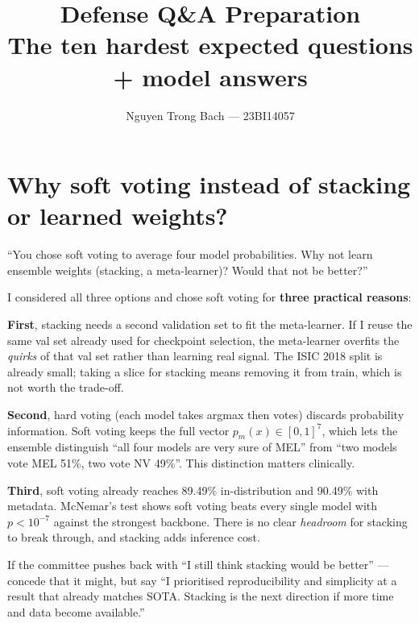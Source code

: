 \documentclass[11pt,a4paper]{article}
\title{
  \vspace{-1.5cm}
  \color{usthblue}\Large\textbf{Defense Q\&A Preparation}\\[4pt]
  \color{black!75}\normalsize The ten hardest expected questions + model answers
}
\author{Nguyen Trong Bach --- 23BI14057}
\date{}
\begin{document}
\maketitle
\vspace{-0.8cm}

{\hypersetup{linkcolor=black}\tableofcontents}
\newpage

\section{Why soft voting instead of stacking or learned weights?}

\begin{question}
``You chose soft voting to average four model probabilities. Why not learn ensemble weights (stacking, a meta-learner)? Would that not be better?''
\end{question}

\begin{answer}
I considered all three options and chose soft voting for \textbf{three practical reasons}:

\textbf{First}, stacking needs a second validation set to fit the meta-learner. If I reuse the same val set already used for checkpoint selection, the meta-learner overfits the \textit{quirks} of that val set rather than learning real signal. The ISIC 2018 split is already small; taking a slice for stacking means removing it from train, which is not worth the trade-off.

\textbf{Second}, hard voting (each model takes argmax then votes) discards probability information. Soft voting keeps the full vector $p_m(x) \in [0,1]^7$, which lets the ensemble distinguish ``all four models are very sure of MEL'' from ``two models vote MEL 51\%, two vote NV 49\%''. This distinction matters clinically.

\textbf{Third}, soft voting already reaches 89.49\% in-distribution and 90.49\% with metadata. McNemar's test shows soft voting beats every single model with $p < 10^{-7}$ against the strongest backbone. There is no clear \textit{headroom} for stacking to break through, and stacking adds inference cost.
\end{answer}

\begin{tip}
If the committee pushes back with ``I still think stacking would be better'' --- concede that it might, but say ``I prioritised reproducibility and simplicity at a result that already matches SOTA. Stacking is the next direction if more time and data become available.''
\end{tip}
\end{document}
